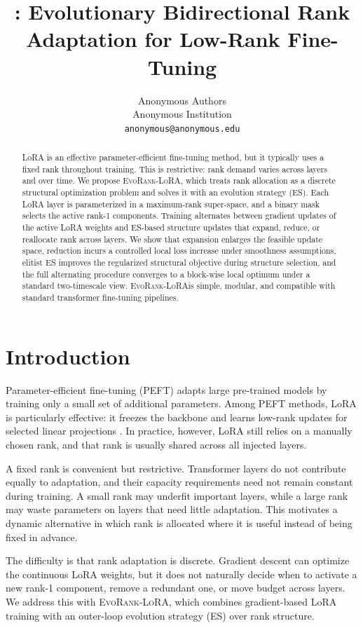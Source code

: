 \documentclass{article}
\title{\method: Evolutionary Bidirectional Rank Adaptation for Low-Rank Fine-Tuning}
\author{%
  Anonymous Authors \\
  Anonymous Institution \\
  \texttt{anonymous@anonymous.edu}
}
\newcommand{\method}{\textsc{EvoRank-LoRA}}
\begin{document}
\maketitle

\begin{abstract}
LoRA is an effective parameter-efficient fine-tuning method, but it typically uses a fixed rank throughout training. This is restrictive: rank demand varies across layers and over time. We propose \method, which treats rank allocation as a discrete structural optimization problem and solves it with an evolution strategy (ES). Each LoRA layer is parameterized in a maximum-rank super-space, and a binary mask selects the active rank-1 components. Training alternates between gradient updates of the active LoRA weights and ES-based structure updates that expand, reduce, or reallocate rank across layers. We show that expansion enlarges the feasible update space, reduction incurs a controlled local loss increase under smoothness assumptions, elitist ES improves the regularized structural objective during structure selection, and the full alternating procedure converges to a block-wise local optimum under a standard two-timescale view. \method is simple, modular, and compatible with standard transformer fine-tuning pipelines.
\end{abstract}

\section{Introduction}
Parameter-efficient fine-tuning (PEFT) adapts large pre-trained models by training only a small set of additional parameters. Among PEFT methods, LoRA is particularly effective: it freezes the backbone and learns low-rank updates for selected linear projections \citep{hu2022lora}. In practice, however, LoRA still relies on a manually chosen rank, and that rank is usually shared across all injected layers.

A fixed rank is convenient but restrictive. Transformer layers do not contribute equally to adaptation, and their capacity requirements need not remain constant during training. A small rank may underfit important layers, while a large rank may waste parameters on layers that need little adaptation. This motivates a dynamic alternative in which rank is allocated where it is useful instead of being fixed in advance.

The difficulty is that rank adaptation is discrete. Gradient descent can optimize the continuous LoRA weights, but it does not naturally decide when to activate a new rank-1 component, remove a redundant one, or move budget across layers. We address this with \method, which combines gradient-based LoRA training with an outer-loop evolution strategy (ES) over rank structure.
\end{document}
